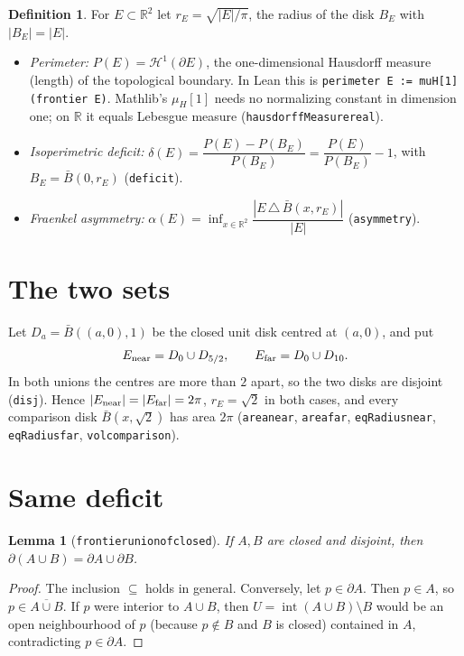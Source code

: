 \documentclass[11pt]{article}
\newtheorem{lemma}[theorem]{Lemma}
\theoremstyle{definition}
\newtheorem{definition}[theorem]{Definition}
\theoremstyle{remark}
\renewcommand{\_}{\oldus\allowbreak}
\newcommand{\R}{\mathbb{R}}
\newcommand{\Hm}{\mathcal{H}^1}
\begin{document}
\begin{definition}
For $E\subset\R^2$ let $r_E=\sqrt{|E|/\pi}$, the radius of the disk $B_E$ with $|B_E|=|E|$.
\begin{itemize}
\item \emph{Perimeter:} $P(E)=\Hm(\partial E)$, the one-dimensional Hausdorff measure (length) of
  the topological boundary. In Lean this is \texttt{perimeter E := muH[1] (frontier E)}. Mathlib's
  $\mu_H[1]$ needs no normalizing constant in dimension one; on $\R$ it equals Lebesgue measure
  (\texttt{hausdorffMeasure\_real}).
\item \emph{Isoperimetric deficit:} $\delta(E)=\dfrac{P(E)-P(B_E)}{P(B_E)}=\dfrac{P(E)}{P(B_E)}-1$,
  with $B_E=\bar B(0,r_E)$ (\texttt{deficit}).
\item \emph{Fraenkel asymmetry:}
  $\alpha(E)=\inf_{x\in\R^2}\dfrac{|E\,\triangle\,\bar B(x,r_E)|}{|E|}$ (\texttt{asymmetry}).
\end{itemize}
\end{definition}

\section{The two sets}

Let $D_a=\bar B((a,0),1)$ be the closed unit disk centred at $(a,0)$, and put
\[
E_{\rm near}=D_0\cup D_{5/2},\qquad E_{\rm far}=D_0\cup D_{10}.
\]
In both unions the centres are more than $2$ apart, so the two disks are disjoint
(\texttt{disj}). Hence $|E_{\rm near}|=|E_{\rm far}|=2\pi$, $r_E=\sqrt2$ in both cases, and every
comparison disk $\bar B(x,\sqrt2)$ has area $2\pi$ (\texttt{area\_near}, \texttt{area\_far},
\texttt{eqRadius\_near}, \texttt{eqRadius\_far}, \texttt{vol\_comparison}).

\section{Same deficit}

\begin{lemma}[\texttt{frontier\_union\_of\_closed}]
If $A,B$ are closed and disjoint, then $\partial(A\cup B)=\partial A\cup\partial B$.
\end{lemma}
\begin{proof}
The inclusion $\subseteq$ holds in general. Conversely, let $p\in\partial A$. Then $p\in A$, so
$p\in\overline{A\cup B}$. If $p$ were interior to $A\cup B$, then $U=\operatorname{int}(A\cup B)
\setminus B$ would be an open neighbourhood of $p$ (because $p\notin B$ and $B$ is closed)
contained in $A$, contradicting $p\in\partial A$.
\end{proof}
\end{document}
